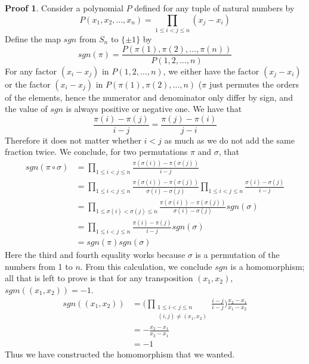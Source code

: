 \documentclass[12pt]{amsbook}
\theoremstyle{definition}
\newtheorem*{prf}{Proof}
\begin{document}
\begin{prf}
    Consider a polynomial $P$ defined for any tuple of natural numbers by
    \[ P(x_1, x_2, \dots, x_n) = \prod_{1 \leq i < j \leq n} (x_j - x_i) \]
    Define the map $sgn$ from $S_n$ to $\{ \pm 1 \}$ by
    \[ sgn(\pi) = \frac{P(\pi(1), \pi(2), \dots, \pi(n))}{P(1,2, \dots, n)} \]
    For any factor $(x_i - x_j)$ in $P(1, 2, \dots, n)$, we either have the factor $(x_j - x_i)$ or the factor $(x_i - x_j)$ in $P(\pi(1), \pi(2), \dots, n)$ ($\pi$ just permutes the orders of the elements, hence the numerator and denominator only differ by sign, and the value of $sgn$ is always positive or negative one. We have that
    \[ \frac{\pi(i) - \pi(j)}{i - j} = \frac{\pi(j) - \pi(i)}{j - i} \]
    Therefore it does not matter whether $i < j$ as much as we do not add the same fraction twice. We conclude, for two permutations $\pi$ and $\sigma$, that
    \begin{align*}
        sgn(\pi \circ \sigma) &= \prod_{1 \leq i < j \leq n} \frac{\pi(\sigma(i)) - \pi(\sigma(j))}{i - j}\\
        &= \prod_{1 \leq i < j \leq n} \frac{\pi(\sigma(i)) - \pi(\sigma(j))}{\sigma(i) - \sigma(j)} \prod_{1 \leq i < j \leq n} \frac{\sigma(i) - \sigma(j)}{i - j}\\
        &= \prod_{1 \leq \sigma(i) < \sigma(j) \leq n} \frac{\pi(\sigma(i)) - \pi(\sigma(j))}{\sigma(i) - \sigma(j)} sgn(\sigma)\\
        &= \prod_{1 \leq i < j \leq n} \frac{\pi(i) - \pi(j)}{i - j} sgn(\sigma)\\
        &= sgn(\pi) sgn(\sigma)
    \end{align*}
    Here the third and fourth equality works because $\sigma$ is a permutation of the numbers from 1 to $n$. From this calculation, we conclude $sgn$ is a homomorphism; all that is left to prove is that for any transposition $(x_1, x_2)$, $sgm((x_1, x_2)) = -1$.
    \begin{align*}
        sgn((x_1, x_2)) &= \Bigg( \prod_{\substack{1 \leq i < j \leq n\\(i,j) \neq (x_1, x_2)}} \frac{i - j}{i - j} \Bigg) \frac{x_2 - x_1}{x_1 - x_2}\\
        &= - \frac{x_2 - x_1}{x_2 - x_1}\\
        &= -1
    \end{align*}
    Thus we have constructed the homomorphism that we wanted.
\end{prf}
\end{document}
